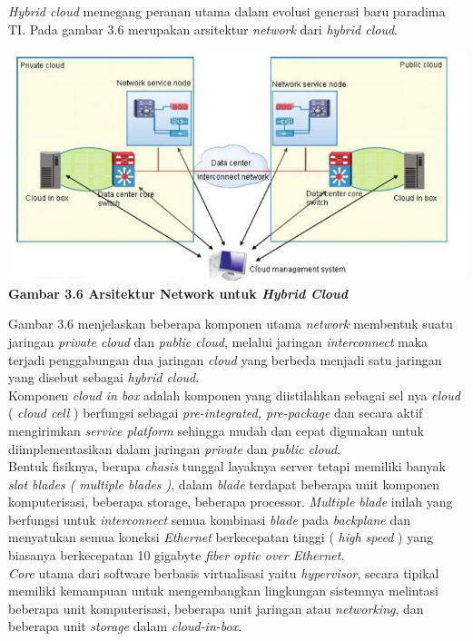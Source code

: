 \textit{Hybrid cloud} memegang peranan utama dalam evolusi generasi baru paradima TI. Pada gambar 3.6 merupakan arsitektur \textit{network} dari \textit{hybrid cloud}.
\begin{center}
\includegraphics[scale=1]{Gambar36.jpg}\\
\textbf{Gambar 3.6 Arsitektur Network untuk \textit{Hybrid Cloud}}
\end{center}
Gambar 3.6 menjelaskan beberapa komponen utama \textit{network} membentuk suatu jaringan\textit{ private cloud} dan \textit{public cloud}, melalui jaringan \textit{interconnect} maka terjadi penggabungan dua jaringan \textit{cloud} yang berbeda menjadi satu jaringan yang disebut sebagai \textit{hybrid cloud}.\\
\tab Komponen \textit{cloud in box }adalah komponen yang diistilahkan sebagai sel nya \textit{cloud} ( \textit{cloud cell }) berfungsi sebagai \textit{pre-integrated, pre-package} dan secara aktif mengirimkan \textit{service platform} sehingga mudah dan cepat digunakan untuk diimplementasikan dalam jaringan \textit{private} dan \textit{public cloud}.\\
\tab Bentuk fisiknya, berupa \textit{chasis} tunggal layaknya server tetapi memiliki banyak \textit{slot blades ( multiple blades )}, dalam \textit{blade} terdapat beberapa unit komponen komputerisasi, beberapa storage, beberapa processor. \textit{Multiple blade} inilah yang berfungsi untuk \textit{interconnect} semua kombinasi \textit{blade} pada \textit{backplane} dan menyatukan semua koneksi \textit{Ethernet} berkecepatan tinggi ( \textit{high speed} ) yang biasanya berkecepatan 10 gigabyte \textit{fiber optic over Ethernet.}\\
\tab \textit{Core} utama dari software berbasis virtualisasi yaitu \textit{hypervisor}, secara tipikal memiliki kemampuan untuk mengembangkan lingkungan sistemnya melintasi beberapa unit komputerisasi, beberapa unit jaringan atau \textit{networking}, dan beberapa unit \textit{storage} dalam \textit{cloud-in-box}.\\
